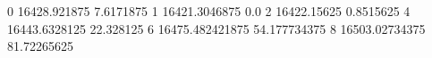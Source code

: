 0 16428.921875 7.6171875
1 16421.3046875 0.0
2 16422.15625 0.8515625
4 16443.6328125 22.328125
6 16475.482421875 54.177734375
8 16503.02734375 81.72265625
